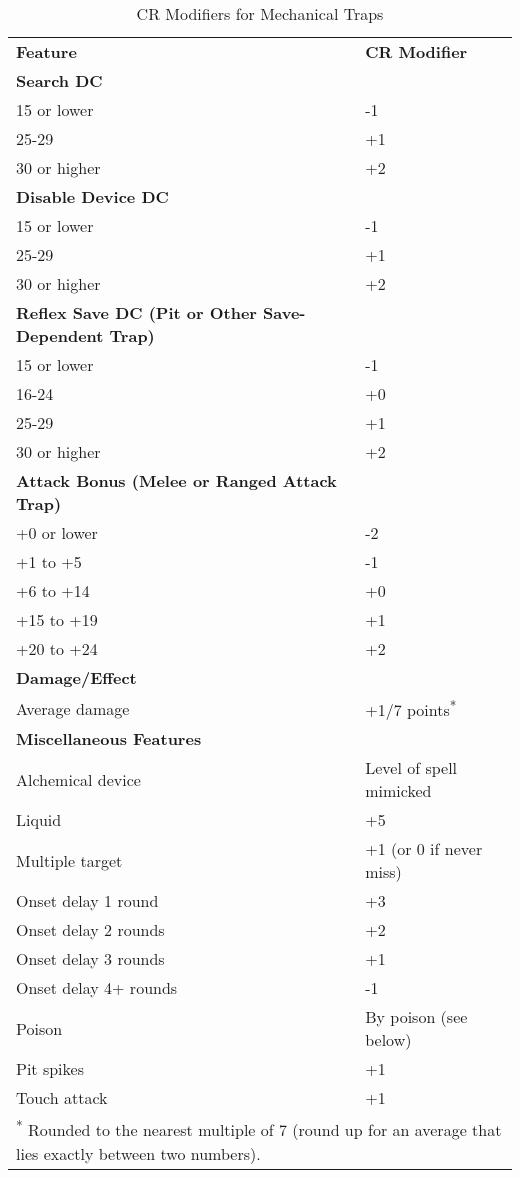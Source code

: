 \begin{table}[htb]
\caption{CR Modifiers for Mechanical Traps}
\centering
\begin{tabular}{l l}
\textbf{Feature} & \textbf{CR Modifier}\\
\textbf{Search DC}&\\
15 or lower &-1\\
25-29 &+1\\
30 or higher &+2\\
\textbf{Disable Device DC}&\\
15 or lower &-1\\
25-29 &+1\\
30 or higher &+2\\
\textbf{Reflex Save DC (Pit or Other Save-Dependent Trap)}&\\
15 or lower &-1\\
16-24 &+0\\
25-29 &+1\\
30 or higher &+2\\
\textbf{Attack Bonus (Melee or Ranged Attack Trap)}&\\
+0 or lower &-2\\
+1 to +5 &-1\\
+6 to +14 &+0\\
+15 to +19 &+1\\
+20 to +24 &+2\\
\textbf{Damage/Effect}&\\
Average damage &+1/7 points\textsuperscript{*}\\
\textbf{Miscellaneous Features}&\\
Alchemical device &Level of spell mimicked\\
Liquid &+5\\
Multiple target &+1 (or 0 if never miss)\\
Onset delay 1 round &+3\\
Onset delay 2 rounds &+2\\
Onset delay 3 rounds &+1\\
Onset delay 4+ rounds &-1\\
Poison & By poison (see below)\\
Pit spikes &+1\\
Touch attack &+1\\
\multicolumn{2}{l}{\textsuperscript{*} Rounded to the nearest multiple of 7 (round up for an average that lies exactly between two numbers).}\\
\end{tabular}
\end{table}

